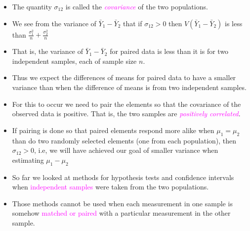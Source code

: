 \documentclass[xcolor=dvipsnames,12pt]{beamer}
\begin{document}
\begin{frame}
\begin{itemize}
\item The quantity $\sigma_{12}$ is called the \textcolor{magenta}{\textit{covariance}} of the two 
populations.
\item We see from the variance of  $\bar{Y}_1 - \bar{Y}_2$
that if $\sigma_{12} > 0$ then $V(\bar{Y}_1 - \bar{Y}_2)$ is less than  $\frac{\sigma_1^2}{n} + 
  \frac{\sigma_2^2}{n}$
\item That is, the variance of  $\bar{Y}_1 - \bar{Y}_2$ for paired data is less than it is for two independent samples, each of sample size $n$.
\item Thus we expect the differences of means for paired data  to have a smaller variance
 than when the difference of means is from two independent samples.
 \item For this to occur we need to pair the elements so that the covariance of the observed data is positive. That is, the two samples are \textcolor{magenta}{\textit{positively correlated}}.
\end{itemize}
\end{frame}


 
\begin{frame}
\begin{itemize}
 \item If pairing is done so that paired elements respond more alike
when $\mu_1 = \mu_2$ than do two randomly selected elements
(one from each population), then $\sigma_{12} > 0$,  i.e, we
will have achieved our goal of smaller variance when estimating
$\mu_1 - \mu_2$
 \item So far we looked at methods for hypothesis tests and confidence
intervals when  \textcolor{magenta}{independent samples} were taken from the
 two populations.
 \item Those methods cannot  be used when each measurement in one sample
is somehow \textcolor{magenta}{ matched or paired} with a particular measurement
in the other sample.
\end{itemize}
\end{frame}
\end{document}
